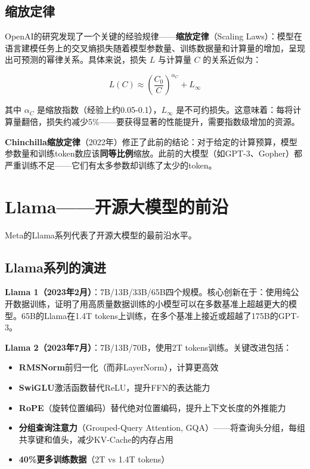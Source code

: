 \subsection{缩放定律}

OpenAI的研究发现了一个关键的经验规律——\textbf{缩放定律}（Scaling Laws）：模型在语言建模任务上的交叉熵损失随着模型参数量、训练数据量和计算量的增加，呈现出可预测的幂律关系。具体来说，损失 $L$ 与计算量 $C$ 的关系近似为：

\[
L(C) \approx \left(\frac{C_0}{C}\right)^{\alpha_C} + L_{\infty}
\]

其中 $\alpha_C$ 是缩放指数（经验上约0.05-0.1），$L_{\infty}$ 是不可约损失。这意味着：每将计算量翻倍，损失约减少5\%——要获得显著的性能提升，需要指数级增加的资源。

\textbf{Chinchilla缩放定律}（2022年）修正了此前的结论：对于给定的计算预算，模型参数量和训练token数应该\textbf{同等比例}缩放。此前的大模型（如GPT-3、Gopher）都严重训练不足——它们有太多参数却训练了太少的token。

\section{Llama——开源大模型的前沿}

Meta的Llama系列代表了开源大模型的最前沿水平。

\subsection{Llama系列的演进}

\textbf{Llama 1（2023年2月）}：7B/13B/33B/65B四个规模。核心创新在于：使用纯公开数据训练，证明了用高质量数据训练的小模型可以在多数基准上超越更大的模型。65B的Llama在1.4T tokens上训练，在多个基准上接近或超越了175B的GPT-3。

\textbf{Llama 2（2023年7月）}：7B/13B/70B，使用2T tokens训练。关键改进包括：
\begin{itemize}
    \item \textbf{RMSNorm}前归一化（而非LayerNorm），计算更高效
    \item \textbf{SwiGLU}激活函数替代ReLU，提升FFN的表达能力
    \item \textbf{RoPE}（旋转位置编码）替代绝对位置编码，提升上下文长度的外推能力
    \item \textbf{分组查询注意力}（Grouped-Query Attention, GQA）——将查询头分组，每组共享键和值头，减少KV-Cache的内存占用
    \item \textbf{40\%更多训练数据}（2T vs 1.4T tokens）
\end{itemize}

